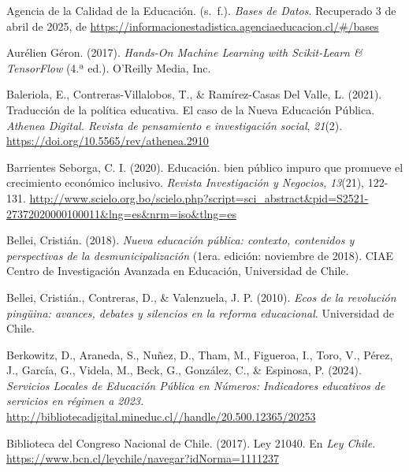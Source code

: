 \documentclass[
  12pt,
  letterpaper,
]{article}
\newlength{\cslhangindent}
\newenvironment{CSLReferences}[2] %
 {\begin{list}{}{%
  \setlength{\itemindent}{0pt}
  \setlength{\leftmargin}{0pt}
  \setlength{\parsep}{0pt}
  \ifodd #1
   \setlength{\leftmargin}{\cslhangindent}
   \setlength{\itemindent}{-1\cslhangindent}
  \fi
  \setlength{\itemsep}{#2\baselineskip}}}
 {\end{list}}
\begin{document}
\label{refs}
\begin{CSLReferences}{1}{0}
Agencia de la Calidad de la Educación. (s.~f.). \emph{Bases de {Datos}}. Recuperado 3 de abril de 2025, de \url{https://informacionestadistica.agenciaeducacion.cl/\#/bases}

Aurélien Géron. (2017). \emph{Hands-{On} {Machine} {Learning} with {Scikit}-{Learn} \& {TensorFlow}} (4.ª ed.). O'Reilly Media, Inc.

Baleriola, E., Contreras-Villalobos, T., \& Ramírez-Casas Del Valle, L. (2021). Traducción de la política educativa. {El} caso de la {Nueva} {Educación} {Pública}. \emph{Athenea Digital. Revista de pensamiento e investigación social}, \emph{21}(2). \url{https://doi.org/10.5565/rev/athenea.2910}

Barrientes Seborga, C. I. (2020). Educación. bien público impuro que promueve el crecimiento económico inclusivo. \emph{Revista Investigación y Negocios}, \emph{13}(21), 122-131. \url{http://www.scielo.org.bo/scielo.php?script=sci_abstract&pid=S2521-27372020000100011&lng=es&nrm=iso&tlng=es}

Bellei, Cristián. (2018). \emph{Nueva educación pública: contexto, contenidos y perspectivas de la desmunicipalización} (1era. edición: noviembre de 2018). CIAE Centro de Investigación Avanzada en Educación, Universidad de Chile.

Bellei, Cristián., Contreras, D., \& Valenzuela, J. P. (2010). \emph{Ecos de la revolución pingüina: avances, debates y silencios en la reforma educacional}. Universidad de Chile.

Berkowitz, D., Araneda, S., Nuñez, D., Tham, M., Figueroa, I., Toro, V., Pérez, J., García, G., Videla, M., Beck, G., González, C., \& Espinosa, P. (2024). \emph{Servicios {Locales} de {Educación} {Pública} en {Números}: {Indicadores} educativos de servicios en régimen a 2023.} \url{http://bibliotecadigital.mineduc.cl//handle/20.500.12365/20253}

Biblioteca del Congreso Nacional de Chile. (2017). Ley 21040. En \emph{Ley Chile}. \url{https://www.bcn.cl/leychile/navegar?idNorma=1111237}


\end{CSLReferences}
\end{document}
